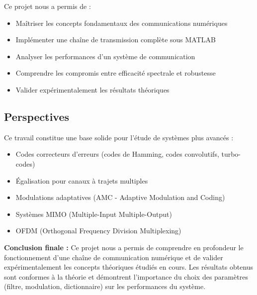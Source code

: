 \documentclass[12pt,a4paper]{article}
\begin{document}
Ce projet nous a permis de :
\begin{itemize}
    \item Maîtriser les concepts fondamentaux des communications numériques
    \item Implémenter une chaîne de transmission complète sous MATLAB
    \item Analyser les performances d'un système de communication
    \item Comprendre les compromis entre efficacité spectrale et robustesse
    \item Valider expérimentalement les résultats théoriques
\end{itemize}

\subsection*{Perspectives}

Ce travail constitue une base solide pour l'étude de systèmes plus avancés :
\begin{itemize}
    \item Codes correcteurs d'erreurs (codes de Hamming, codes convolutifs, turbo-codes)
    \item Égalisation pour canaux à trajets multiples
    \item Modulations adaptatives (AMC - Adaptive Modulation and Coding)
    \item Systèmes MIMO (Multiple-Input Multiple-Output)
    \item OFDM (Orthogonal Frequency Division Multiplexing)
\end{itemize}

\vspace{1cm}

\textbf{Conclusion finale :} Ce projet nous a permis de comprendre en profondeur le fonctionnement d'une chaîne de communication numérique et de valider expérimentalement les concepts théoriques étudiés en cours. Les résultats obtenus sont conformes à la théorie et démontrent l'importance du choix des paramètres (filtre, modulation, dictionnaire) sur les performances du système.
\end{document}
